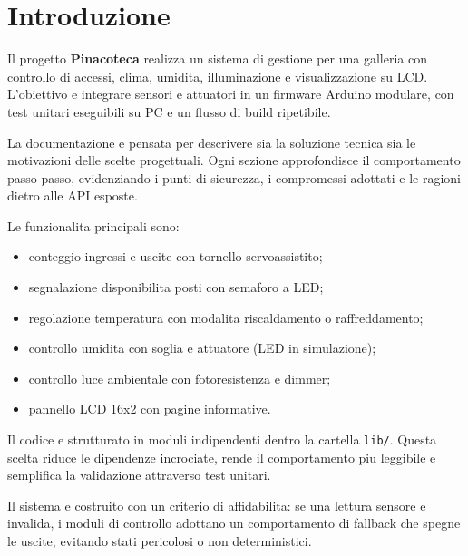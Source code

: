 \chapter{Introduzione}

Il progetto \textbf{Pinacoteca} realizza un sistema di gestione per una galleria con controllo di accessi, clima, umidita, illuminazione e visualizzazione su LCD. L'obiettivo e integrare sensori e attuatori in un firmware Arduino modulare, con test unitari eseguibili su PC e un flusso di build ripetibile.

La documentazione e pensata per descrivere sia la soluzione tecnica sia le motivazioni delle scelte progettuali. Ogni sezione approfondisce il comportamento passo passo, evidenziando i punti di sicurezza, i compromessi adottati e le ragioni dietro alle API esposte.

Le funzionalita principali sono:
\begin{itemize}
  \item conteggio ingressi e uscite con tornello servoassistito;
  \item segnalazione disponibilita posti con semaforo a LED;
  \item regolazione temperatura con modalita riscaldamento o raffreddamento;
  \item controllo umidita con soglia e attuatore (LED in simulazione);
  \item controllo luce ambientale con fotoresistenza e dimmer;
  \item pannello LCD 16x2 con pagine informative.
\end{itemize}

Il codice e strutturato in moduli indipendenti dentro la cartella \texttt{lib/}. Questa scelta riduce le dipendenze incrociate, rende il comportamento piu leggibile e semplifica la validazione attraverso test unitari.

Il sistema e costruito con un criterio di affidabilita: se una lettura sensore e invalida, i moduli di controllo adottano un comportamento di fallback che spegne le uscite, evitando stati pericolosi o non deterministici.
